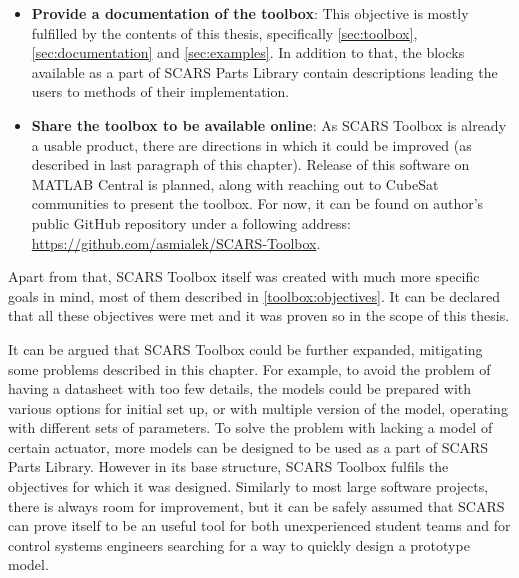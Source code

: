 \begin{itemize}
        \item \textbf{Provide a documentation of the toolbox}: This objective is mostly fulfilled by the contents of this thesis, specifically \autoref{sec:toolbox}, \autoref{sec:documentation} and \autoref{sec:examples}. In addition to that, the blocks available as a part of SCARS Parts Library contain descriptions leading the users to methods of their implementation. 
        \item \textbf{Share the toolbox to be available online}: As SCARS Toolbox is already a usable product, there are directions in which it could be improved (as described in last paragraph of this chapter). 
        Release of this software on MATLAB Central is planned, along with reaching out to CubeSat communities to present the toolbox. For now, it can be found on author's public GitHub repository under a following address: \url{https://github.com/asmialek/SCARS-Toolbox}.
    \end{itemize}

    Apart from that, SCARS Toolbox itself was created with much more specific goals in mind, most of them described in \autoref{toolbox:objectives}. It can be declared that all these objectives were met and it was proven so in the scope of this thesis.

    It can be argued that SCARS Toolbox could be further expanded, mitigating some problems described in this chapter. For example, to avoid the problem of having a datasheet with too few details, the models could be prepared with various options for initial set up, or with multiple version of the model, operating with different sets of parameters. To solve the problem with lacking a model of certain actuator, more models can be designed to be used as a part of SCARS Parts Library. However in its base structure, SCARS Toolbox fulfils the objectives for which it was designed. Similarly to most large software projects, there is always room for improvement, but it can be safely assumed that SCARS can prove itself to be an useful tool for both unexperienced student teams and for control systems engineers searching for a way to quickly design a prototype model. 




